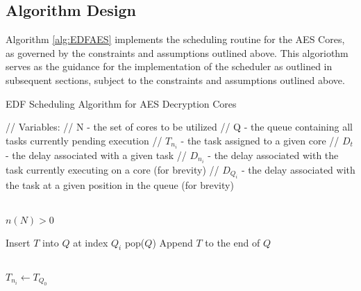 \subsection{Algorithm Design}\label{subsec:AlgoImpl}
Algorithm \ref{alg:EDFAES} implements the scheduling routine for the AES Cores, as governed by the constraints and assumptions outlined above. This algoriothm serves as the guidance for the implementation of the scheduler as outlined in subsequent sections, subject to the constraints and assumptions outlined above.
\begin{algorithm}
    \caption{EDF Scheduling Algorithm for AES Decryption Cores}\label{alg:EDFAES}
    \begin{algorithmic}


        \State // Variables: 
        \State // N - the set of cores to be utilized
        \State // Q - the queue containing all tasks currently pending execution
        \State // $T_{n_i}$ - the task assigned to a given core
        \State // $D_t$ - the delay associated with a given task
        \State // $D_{n_i}$ - the delay associated with the task currently executing on a core (for brevity)
        \State // $D_{Q_i}$ - the delay associated with the task at a given position in the queue (for brevity)

        \\

        \Require $n(N) > 0$ 

                    \State Insert $T$ into $Q$ at index $Q_i$
                    \State \Return pop($Q$)
                \EndIf
            \EndFor
            \State Append $T$ to the end of $Q$ 
        \EndFunction

        \\

         
                        \State $T_{n_i} \gets T_{Q_0}$ 


\end{algorithmic}
\end{algorithm}
